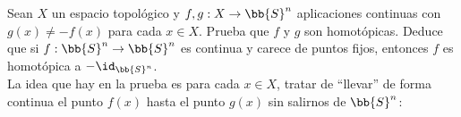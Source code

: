 \begin{ejercicio}
    Sean $X$ un espacio topológico y $f,g:X\to \bb{S}^n$ aplicaciones continuas con $g(x)\neq -f(x)$ para cada $x\in X$. Prueba que $f$ y $g$ son homotópicas. Deduce que si $f:\bb{S}^n\to \bb{S}^n$ es continua y carece de puntos fijos, entonces $f$ es homotópica a $-\id_{\bb{S}^n}$.\\

    \noindent
    La idea que hay en la prueba es para cada $x\in X$, tratar de ``llevar'' de forma continua el punto $f(x)$ hasta el punto $g(x)$ sin salirnos de $\bb{S}^n$:
        \begin{figure}[H]
            \centering
        \end{figure}


\end{ejercicio}
